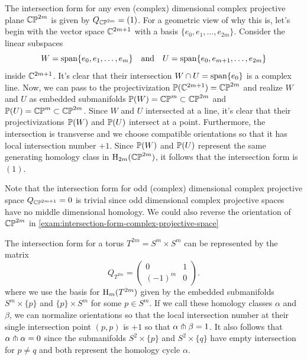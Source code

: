 \begin{example}\label{exam:intersection-form-complex-projective-space}
	The intersection form for any even (complex) dimensional complex projective plane $\CP^{2m}$ is given by $Q_{\CP^{2m}}=(1)$.  For a geometric view of why this is, let's begin with the vector space $\C^{2m+1}$ with a basis $\{e_0, e_1,\ldots, e_{2m}\}$. Consider the linear subspaces
	\[
		W = \span\{e_0, e_1,\ldots, e_m\}\quad\textrm{and}\quad U = \span\{e_0, e_{m+1},\ldots, e_{2m}\}
	\]
	inside $\C^{2m+1}$. It's clear that their intersection $W\cap U = \span\{e_0\}$ is a complex line. Now, we can pass to the projectivization $\P(\C^{2m+1})=\CP^{2m}$ and realize $W$ and $U$ as embedded submanifolds $\P(W)=\CP^m\subset \CP^{2m}$ and $\P(U)=\CP^m\subset \CP^{2m}$. Since $W$ and $U$ intersected at a line, it's clear that their projectivizations $\P(W)$ and $\P(U)$ intersect at a point. Furthermore, the intersection is transverse and we choose compatible orientations so that it has local intersection number $+1$. Since $\P(W)$ and $\P(U)$ represent the same generating homology class in $\H_{2m}(\CP^{2m})$, it follows that the intersection form is $(1)$.

	\begin{figure}[ht]
		\centering
		\caption{}
	\end{figure}

\end{example}

Note that the intersection form for odd (complex) dimensional complex projective space $Q_{\CP^{2m+1}}=0$ is trivial since odd dimensional complex projective spaces have no middle dimensional homology. We could also reverse the orientation of $\CP^{2m}$ in \cref{exam:intersection-form-complex-projective-space} 

\begin{example}\label{exam:intersection-form-torus}
	The intersection form for a torus $T^{2m}=S^m\times S^m$ can be represented by the matrix
	\[
		Q_{T^{2m}} = \begin{pmatrix}0 & 1 \\ (-1)^m & 0\end{pmatrix}.
	\]
	where we use the basis for $\H_m(T^{2m})$ given by the embedded submanifolds $S^m\times \{p\}$ and $\{p\}\times S^m$ for some $p\in S^m$. If we call these homology classes $\alpha$ and $\beta$, we can normalize orientations so that the local intersection number at their single intersection point $(p,p)$ is $+1$ so that $\alpha\tnsv \beta=1$. It also follows that $\alpha\tnsv \alpha = 0$ since the submanifolds $S^2\times \{p\}$ and $S^2\times \{q\}$ have empty intersection for $p\neq q$ and both represent the homology cycle $\alpha$.
\end{example}

